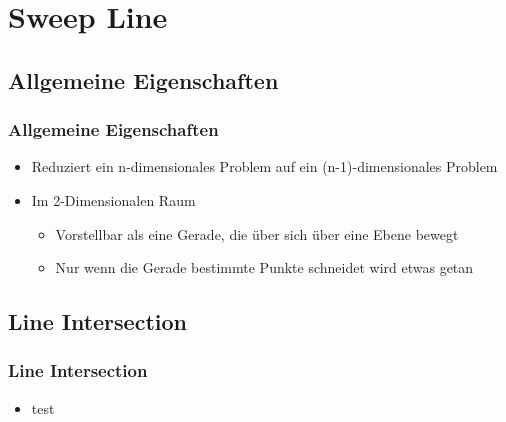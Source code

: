 \section{Sweep Line}
\subsection{Allgemeine Eigenschaften}
\begin{frame}
	\frametitle{{Allgemeine Eigenschaften}}
	\begin{itemize}
		\pause
		\item{Reduziert ein n-dimensionales Problem auf ein (n-1)-dimensionales Problem}
		\pause
		\item{Im 2-Dimensionalen Raum}
		\pause
		\begin{itemize}
			\item{Vorstellbar als eine Gerade, die über sich über eine Ebene bewegt}
			\item{Nur wenn die Gerade bestimmte Punkte schneidet wird etwas getan}
		\end{itemize}
	\end{itemize}
\end{frame}
\subsection{Line Intersection}
\begin{frame}
	\frametitle{{Line Intersection}}
	\begin{itemize}
		\pause
		\item{test}
	\end{itemize}
\end{frame}